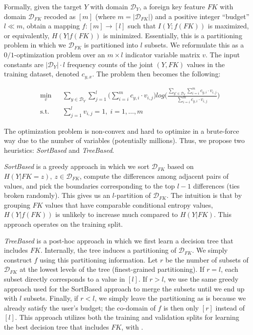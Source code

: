 \documentclass[sigconf]{acmart}
\begin{document}
Formally, given the target $Y$ with domain $\mathcal{D}_Y$, a foreign key feature $FK$ with domain $\mathcal{D}_{FK}$ recoded as $[m]$ 
(where $m = |\mathcal{D}_{FK}|$) and a positive integer ``budget'' $l \ll m$, obtain a mapping $f: [m] \rightarrow [l]$ such that $I(Y; f(FK))$ is maximized,
or equivalently, $H(Y|f(FK))$ is minimized. Essentially, this is a partitioning problem in which we $\mathcal{D}_{FK}$ is partitioned into $l$ subsets. 
We reformulate this as a $0/1$-optimization problem over an $m \times l$ indicator variable matrix $v$.
The input constants are $|\mathcal{D}_Y| \cdot l$ frequency counts of the joint $(Y, FK)$ values in the training dataset, denoted $c_{y, x}$.
The problem then becomes the following:

\begin{equation*}
\begin{aligned}
& \underset{v}{\text{min}}
& & \sum_{y \in \mathcal{D}_Y} \sum_{j=1}^l \bigg(\sum_{i=i}^m c_{y,i} \cdot v_{i,j} \bigg) log \bigg(\frac{\sum_{y' \in \mathcal{D}_Y} \sum_{i=i}^m c_{y,i} \cdot v_{i,j}}{\sum_{i=i}^m c_{y,i} \cdot v_{i,j}}\bigg) \\
& \text{s.t.}
& & \sum_{j=1}^l v_{i,j} = 1, \; i = 1, \ldots, m
\end{aligned}
\end{equation*}

The optimization problem is non-convex and hard to optimize in a brute-force  way due to the number of variables (potentially millions). Thus, we propose two heuristics: \textit{SortBased} and \textit{TreeBased}.

\textit{SortBased} is a greedy approach in which we sort $\mathcal{D}_{FK}$ based on $H(Y|FK=z), ~z \in \mathcal{D}_{FK}$, compute the differences among adjacent pairs of values, and pick the boundaries corresponding to the top $l-1$ differences (ties broken randomly). This gives us an $l$-partition of $\mathcal{D}_{FK}$. The intuition is that by grouping $FK$ values that have comparable conditional entropy values, $H(Y|f(FK))$ is unlikely to increase much compared to $H(Y|FK)$. This approach operates on the training split.

\textit{TreeBased} is a post-hoc approach in which we first learn a decision tree that includes $FK$. Internally, the tree induces a partitioning of 
$\mathcal{D}_{FK}$. We simply construct $f$ using this partitioning information. Let $r$ be the number of subsets of $\mathcal{D}_{FK}$ at the lowest levels of the tree 
(finest-grained partitioning). If $r = l$, each subset directly corresponds to a value in $[l]$. If $r > l$, we use the same greedy approach used for the SortBased 
approach to merge the subsets until we end up with $l$ subsets. Finally, if $r < l$, we simply leave the partitioning as is because we already satisfy the user's budget;
the co-domain of $f$ is then only $[r]$ instead of $[l]$. This approach utilizes both the training and validation splits for learning the best decision tree that includes $FK$, with .
\end{document}
